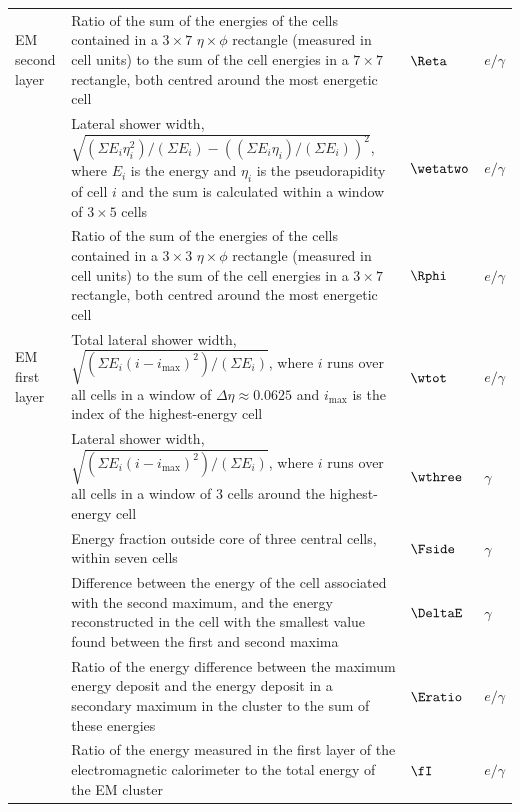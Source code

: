 \begin{table}
\begin{tabular}{llll}
    EM second layer
    & Ratio of the sum of the energies of
    the cells contained in a $3\times7$ $\eta\times\phi$
    rectangle (measured in cell units)  to the sum of
    the cell energies in a $7\times7$ rectangle, both centred around the
    most energetic cell & $\Reta$ & $e/\gamma$ \\
    & Lateral shower width, $\sqrt{(\Sigma E_i \eta_i^2)/(\Sigma E_i)
      -((\Sigma E_i\eta_i)/(\Sigma E_i))^2}$, where $E_i$ is the energy
      and $\eta_i$ is the pseudorapidity of cell $i$ and the sum is calculated within a window of $3\times5$ cells
       & $\wetatwo$ & $e/\gamma$ \\
    & Ratio of the sum of the energies of
    the cells contained in a $3\times3$ $\eta\times\phi$
    rectangle (measured in cell units) to the sum of
    the cell energies in a $3\times7$ rectangle, both centred around the
    most energetic cell  & $\Rphi$ & $e/\gamma$ \\
  
    EM first layer
    & Total lateral shower width, $\sqrt{(\Sigma E_i
      (i-i_\mathrm{max})^2)/(\Sigma E_i)}$, where $i$ runs over all
      cells in a window of $\Delta\eta \approx 0.0625$ and
      $i_{\textrm{max}}$ is the index of the highest-energy cell
       & $\wtot$ & $e/\gamma$ \\
    & Lateral shower width,
      $\sqrt{(\Sigma E_i (i - i_{\textrm{max}})^2)/(\Sigma E_i)}$,
      where $i$ runs over all cells in a window of 3 cells around the
      highest-energy cell & $\wthree$ & $\gamma$ \\
    & Energy fraction outside core of three central cells, within seven cells   & $\Fside$ & $\gamma$ \\
    & Difference between the energy of the cell associated with the
      second maximum, and the energy reconstructed
      in the cell with the smallest value found between the first and
      second maxima  & $\DeltaE$ & $\gamma$ \\
    & Ratio of the energy difference between the maximum energy deposit and the energy deposit in a secondary maximum in the cluster to the sum of these energies   & $\Eratio$ & $e/\gamma$ \\
    & Ratio of the energy measured in the first layer of the electromagnetic calorimeter to the total energy of the
      EM cluster & $\fI$ & $e/\gamma$ \\
  

\end{tabular}
\end{table}
